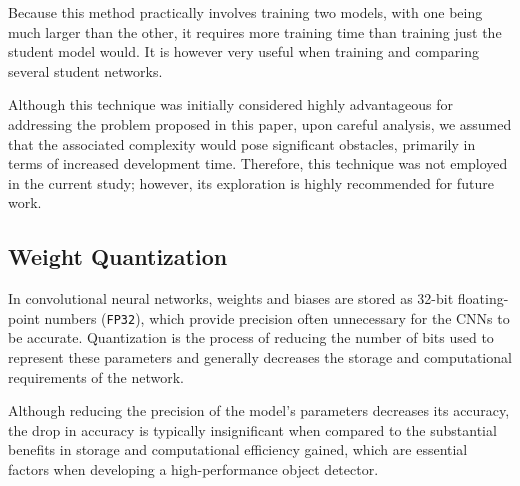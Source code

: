
Because this method practically involves training two models, with one being
much larger than the other, it requires more training time than training just
the student model would. It is however very useful when training and comparing
several student networks.

Although this technique was initially considered highly advantageous for
addressing the problem proposed in this paper, upon careful analysis, we assumed
that the associated complexity would pose significant obstacles, primarily in
terms of increased development time. Therefore, this technique was not employed
in the current study; however, its exploration is highly recommended for future work.


\subsection{Weight Quantization}


In convolutional neural networks, weights and biases are stored as 32-bit
floating-point numbers (\texttt{FP32}), which provide precision often
unnecessary for the CNNs to be accurate. Quantization is the process of reducing
the number of bits used to represent these parameters and generally decreases
the storage and computational requirements of the network.

Although reducing the precision of the model's parameters decreases its
accuracy, the drop in accuracy is typically insignificant when compared to the
substantial benefits in storage and computational efficiency gained, which are
essential factors when developing a high-performance object detector.

